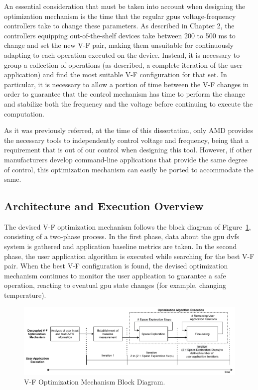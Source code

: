 An essential consideration that must be taken into account when designing the optimization mechanism is the time that the regular \acrshort{gpu}s voltage-frequency controllers take to change these parameters. As described in Chapter 2, the controllers equipping out-of-the-shelf devices take between 200 to 500 ms to change and set the new V-F pair, making them unsuitable for continuously adapting to each operation executed on the device. Instead, it is necessary to group a collection of operations (as described, a complete iteration of the user application) and find the most suitable V-F configuration for that set.
In particular, it is necessary to allow a portion of time between the V-F changes in order to guarantee that the control mechanism has time to perform the change and stabilize both the frequency and the voltage before continuing to execute the computation.

As it was previously referred, at the time of this dissertation, only AMD provides the necessary tools to independently control voltage and frequency, being that a requirement that is out of our control when designing this tool. However, if other manufacturers develop command-line applications that provide the same degree of control, this optimization mechanism can easily be ported to accommodate the same.


\subsection{Architecture and Execution Overview}


The devised V-F optimization mechanism follows the block diagram of Figure~\ref{fig:opt_mech}, consisting of a two-phase process. In the first phase, data about the \acrshort{gpu} \acrshort{dvfs} system is gathered and application baseline metrics are taken. In the second phase, the user application algorithm is executed while searching for the best V-F pair. When the best V-F configuration is found, the devised optimization mechanism continues to monitor the user application to guarantee a safe operation, reacting to eventual \acrshort{gpu} state changes (for example, changing temperature).

\begin{figure}[htb]
  \centering
  \includegraphics[width=\textwidth]{Figures/Optimization/full_mech6.pdf}
  \caption{V-F Optimization Mechanism Block Diagram.}
  \label{fig:opt_mech}
\end{figure}

